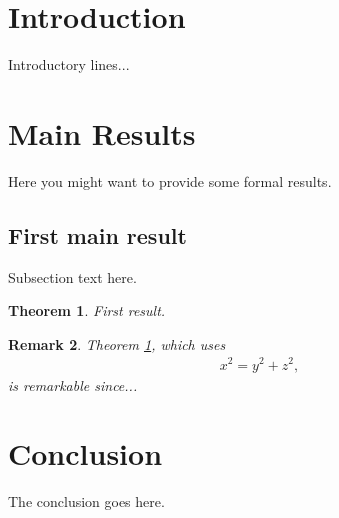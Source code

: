 \documentclass[9pt,conference]{IEEEtran}
\newtheorem{theorem}{Theorem}[section]
\newtheorem{remark}[theorem]{Remark}
\begin{document}


\maketitle


%
\IEEEpeerreviewmaketitle

\begin{abstract}
    Short abstract...
\end{abstract}

\section{Introduction}
Introductory lines...

\section{Main Results}
Here you might want to provide some formal results.
\subsection{First main result}
Subsection text here.
\begin{theorem} \label{thm:Great}
First result.
\end{theorem}
\begin{remark}
Theorem \ref{thm:Great}, which uses
\begin{align} \label{eq:Greater}
    x^2 = y^2 + z^2,
\end{align}
is remarkable since...
\end{remark}






 
\section{Conclusion}
The conclusion goes here.
\end{document}
